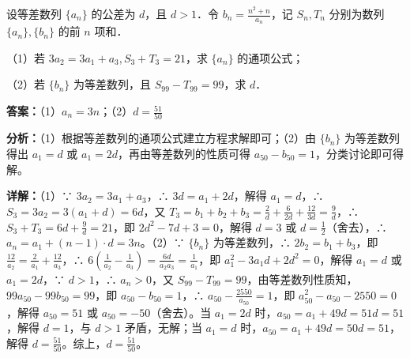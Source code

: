 \begin{question}[points=12]
设等差数列 $\{a_n\}$ 的公差为 $d$，且 $d>1$．令 $b_n=\frac{n^2+n}{a_n}$，记 $S_n, T_n$ 分别为数列 $\{a_n\}, \{b_n\}$ 的前 $n$ 项和．

（1）若 $3a_2=3a_1+a_3, S_3+T_3=21$，求 $\{a_n\}$ 的通项公式；

（2）若 $\{b_n\}$ 为等差数列，且 $S_{99}-T_{99}=99$，求 $d$．
\begin{solution}
\textbf{答案：}（1）$a_n=3n$；（2）$d=\frac{51}{50}$

\textbf{分析：}（1）根据等差数列的通项公式建立方程求解即可；（2）由 $\{b_n\}$ 为等差数列得出 $a_1=d$ 或 $a_1=2d$，再由等差数列的性质可得 $a_{50}-b_{50}=1$，分类讨论即可得解。

\textbf{详解：}（1）∵ $3a_2=3a_1+a_3$，∴ $3d=a_1+2d$，解得 $a_1=d$，∴ $S_3=3a_2=3(a_1+d)=6d$，又 $T_3=b_1+b_2+b_3=\frac{2}{d}+\frac{6}{2d}+\frac{12}{3d}=\frac{9}{d}$，∴ $S_3+T_3=6d+\frac{9}{d}=21$，即 $2d^2-7d+3=0$，解得 $d=3$ 或 $d=\frac{1}{2}$（舍去），∴ $a_n=a_1+(n-1)\cdot d=3n$。（2）∵ $\{b_n\}$ 为等差数列，∴ $2b_2=b_1+b_3$，即 $\frac{12}{a_2}=\frac{2}{a_1}+\frac{12}{a_3}$，∴ $6(\frac{1}{a_2}-\frac{1}{a_3})=\frac{6d}{a_2a_3}=\frac{1}{a_1}$，即 $a_1^2-3a_1d+2d^2=0$，解得 $a_1=d$ 或 $a_1=2d$，∵ $d>1$，∴ $a_n>0$，又 $S_{99}-T_{99}=99$，由等差数列性质知，$99a_{50}-99b_{50}=99$，即 $a_{50}-b_{50}=1$，∴ $a_{50}-\frac{2550}{a_{50}}=1$，即 $a_{50}^2-a_{50}-2550=0$，解得 $a_{50}=51$ 或 $a_{50}=-50$（舍去）。当 $a_1=2d$ 时，$a_{50}=a_1+49d=51d=51$，解得 $d=1$，与 $d>1$ 矛盾，无解；当 $a_1=d$ 时，$a_{50}=a_1+49d=50d=51$，解得 $d=\frac{51}{50}$。综上，$d=\frac{51}{50}$。
\end{solution}
\end{question}

